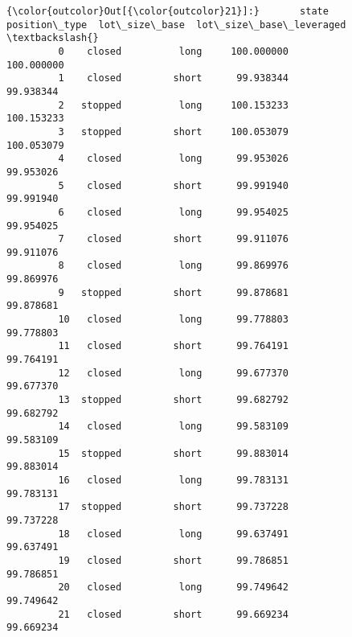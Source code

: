 \documentclass[11pt]{article}
\begin{document}
\begin{Verbatim}[commandchars=\\\{\}]
{\color{outcolor}Out[{\color{outcolor}21}]:}       state position\_type  lot\_size\_base  lot\_size\_base\_leveraged  \textbackslash{}
         0    closed          long     100.000000               100.000000   
         1    closed         short      99.938344                99.938344   
         2   stopped          long     100.153233               100.153233   
         3   stopped         short     100.053079               100.053079   
         4    closed          long      99.953026                99.953026   
         5    closed         short      99.991940                99.991940   
         6    closed          long      99.954025                99.954025   
         7    closed         short      99.911076                99.911076   
         8    closed          long      99.869976                99.869976   
         9   stopped         short      99.878681                99.878681   
         10   closed          long      99.778803                99.778803   
         11   closed         short      99.764191                99.764191   
         12   closed          long      99.677370                99.677370   
         13  stopped         short      99.682792                99.682792   
         14   closed          long      99.583109                99.583109   
         15  stopped         short      99.883014                99.883014   
         16   closed          long      99.783131                99.783131   
         17  stopped         short      99.737228                99.737228   
         18   closed          long      99.637491                99.637491   
         19   closed         short      99.786851                99.786851   
         20   closed          long      99.749642                99.749642   
         21   closed         short      99.669234                99.669234   
         

\end{Verbatim}
\end{document}
